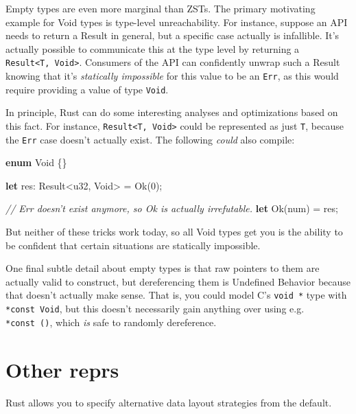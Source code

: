 \documentclass[a4paper,]{book}
\newenvironment{Shaded}{\begin{snugshade}}{\end{snugshade}}
\newcommand{\KeywordTok}[1]{\textcolor[rgb]{0.13,0.29,0.53}{\textbf{{#1}}}}
\newcommand{\DataTypeTok}[1]{\textcolor[rgb]{0.13,0.29,0.53}{{#1}}}
\newcommand{\DecValTok}[1]{\textcolor[rgb]{0.00,0.00,0.81}{{#1}}}
\newcommand{\ConstantTok}[1]{\textcolor[rgb]{0.00,0.00,0.00}{{#1}}}
\newcommand{\CommentTok}[1]{\textcolor[rgb]{0.56,0.35,0.01}{\textit{{#1}}}}
\newcommand{\NormalTok}[1]{{#1}}
\begin{document}
Empty types are even more marginal than ZSTs. The primary motivating
example for Void types is type-level unreachability. For instance,
suppose an API needs to return a Result in general, but a specific case
actually is infallible. It's actually possible to communicate this at
the type level by returning a
\texttt{Result\textless{}T,\ Void\textgreater{}}. Consumers of the API
can confidently unwrap such a Result knowing that it's \emph{statically
impossible} for this value to be an \texttt{Err}, as this would require
providing a value of type \texttt{Void}.

In principle, Rust can do some interesting analyses and optimizations
based on this fact. For instance,
\texttt{Result\textless{}T,\ Void\textgreater{}} could be represented as
just \texttt{T}, because the \texttt{Err} case doesn't actually exist.
The following \emph{could} also compile:

\begin{Shaded}
\begin{Highlighting}[]
\KeywordTok{enum} \NormalTok{Void \{\}}

\KeywordTok{let} \NormalTok{res: }\DataTypeTok{Result}\NormalTok{<}\DataTypeTok{u32}\NormalTok{, Void> = }\ConstantTok{Ok}\NormalTok{(}\DecValTok{0}\NormalTok{);}

\CommentTok{// Err doesn't exist anymore, so Ok is actually irrefutable.}
\KeywordTok{let} \ConstantTok{Ok}\NormalTok{(num) = res;}
\end{Highlighting}
\end{Shaded}

But neither of these tricks work today, so all Void types get you is the
ability to be confident that certain situations are statically
impossible.

One final subtle detail about empty types is that raw pointers to them
are actually valid to construct, but dereferencing them is Undefined
Behavior because that doesn't actually make sense. That is, you could
model C's \texttt{void\ *} type with \texttt{*const\ Void}, but this
doesn't necessarily gain anything over using e.g. \texttt{*const\ ()},
which \emph{is} safe to randomly dereference.

\section{Other reprs}\label{sec--other-reprs}

Rust allows you to specify alternative data layout strategies from the
default.
\end{document}
